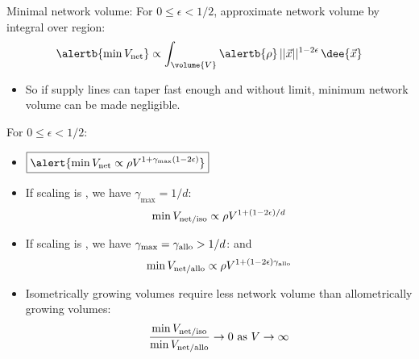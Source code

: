 \begin{frame}

  \begin{block}{Minimal network volume:}
    For $0 \le \epsilon < 1/2$, approximate network volume by integral over region:
    $$ 
    \alertb{\min V_{\textnormal{net}}}  \propto 
    \int_{\volume{V}} \alertb{\rho} \, ||\vec{x}||^{1-2\epsilon} \, \dee{\vec{x}} 
    $$
    \begin{itemize}
    \item<4->
      So if supply lines can taper fast enough and without
      limit, minimum network volume can be made negligible.
    \end{itemize}
  \end{block}

\end{frame}

\begin{frame}

  \begin{block}{For $0 \le \epsilon < 1/2$:}
    \begin{itemize}
    \item<1-> 
      $
      \boxed{\alert{
          \min V_{\textnormal{net}} 
          \propto
          \rho V^{1+\gamma_{\max}(1-2\epsilon)} 
        }}
      $
    \item<2-> 
      If scaling is , we have $\gamma_{\max} = 1/d$:
      $$
      \min V_{\textnormal{net/iso}} 
      \propto
      \rho V^{1+(1-2\epsilon)/d}
      $$
    \item<3-> 
      If scaling is , we have
      $\gamma_{\max} = \gamma_{\textnormal{allo}} > 1/d$:
      and 
      $$
      \min V_{\textnormal{net/allo}} 
      \propto
      \rho V^{1+(1-2\epsilon)\gamma_{\textnormal{allo}}}
      $$
    \item<4-> 
      Isometrically growing volumes 
      \alert{require less network volume} 
      than allometrically growing volumes:
      $$
      \frac{\min V_{\textnormal{net/iso}}}{\min V_{\textnormal{net/allo}}} \rightarrow 0 
      \mbox{\ as $V \rightarrow \infty$}
      $$
    \end{itemize}    
    
  \end{block}
\end{frame}

